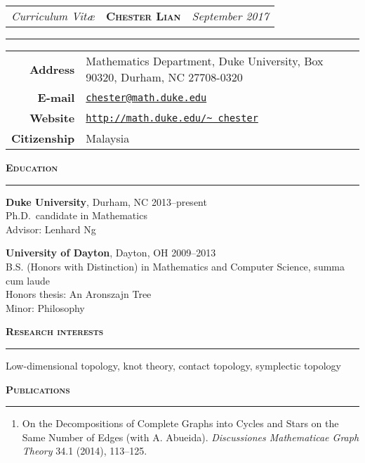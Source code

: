 \documentclass[10pt]{article}
\newcommand{\sect}[1]{
\vspace{.75em}
\textbf{\textsc{\Large #1}}

\vspace{-1.5em}
\noindent\rule{\textwidth}{.5pt}
\vspace{-1.5em}
}
\begin{document}
\thispagestyle{empty} %

\begin{tabularx}{\textwidth}{@{}X >{\centering}X X@{}}
  \emph{\large Curriculum Vit\ae} &
  \textbf{\textsc{\huge Chester Lian}} &
  \hfill\emph{\large September 2017}
\end{tabularx}

\vspace{-1em}
\rule{\textwidth}{1pt}

\begin{center}
\begin{tabular}{rl}
\textbf{Address} &
Mathematics Department, Duke University, Box 90320, Durham, NC 27708-0320 \\
\textbf{E-mail} & \href{mailto:chester@math.duke.edu}{\texttt{chester@math.duke.edu}} \\
\textbf{Website} &
\href{http://math.duke.edu/\~chester}{\texttt{http://math.duke.edu/\textasciitilde
chester}} \\
\textbf{Citizenship} & Malaysia
\end{tabular}
\end{center}
\vspace{-1em}

\sect{Education}

\textbf{Duke University}, Durham, NC \hfill 2013--present \\
Ph.D.\ candidate in Mathematics \\
Advisor: Lenhard Ng

\textbf{University of Dayton}, Dayton, OH \hfill 2009--2013 \\
B.S. (Honors with Distinction) in Mathematics and Computer Science, summa cum
laude \\
Honors thesis: An Aronszajn Tree \\
Minor: Philosophy

\sect{Research interests}

Low-dimensional topology, knot theory, contact topology, symplectic topology

\sect{Publications}

\vspace{-1em}
\begin{enumerate}

  \item On the Decompositions of Complete Graphs into Cycles and Stars on the
  Same Number of Edges (with A. Abueida). \emph{Discussiones
  Mathematicae Graph Theory} 34.1 (2014), 113--125.

\end{enumerate}
\vspace{-1em}
\end{document}
